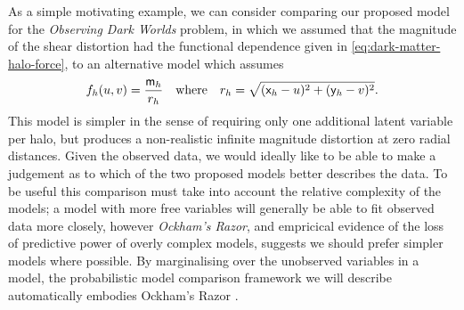 As a simple motivating example, we can consider comparing our proposed model for the \emph{Observing Dark Worlds} problem, in which we assumed that the magnitude of the shear distortion had the functional dependence given in \eqref{eq:dark-matter-halo-force}, to an alternative model which assumes
\begin{equation}\label{eq:dark-matter-halo-force-alt-1}
  f_h(u,v) = \frac{\mathsf{m}_h}{r_h}
  \quad\textrm{where}\quad
  r_h = \sqrt{(\mathsf{x}_h - u)^2 + (\mathsf{y}_h - v)^2}.
\end{equation}
This model is simpler in the sense of requiring only one additional latent variable per halo, but produces a non-realistic infinite magnitude distortion at zero radial distances. Given the observed data, we would ideally like to be able to make a judgement as to which of the two proposed models better describes the data. To be useful this comparison must take into account the relative complexity of the models; a model with more free variables will generally be able to fit observed data more closely, however \emph{Ockham's Razor}, and empricical evidence of the loss of predictive power of overly complex models, suggests we should prefer simpler models where possible. By marginalising over the unobserved variables in a model, the probabilistic model comparison framework we will describe automatically embodies Ockham's Razor \citep{mackay2003information}. 

